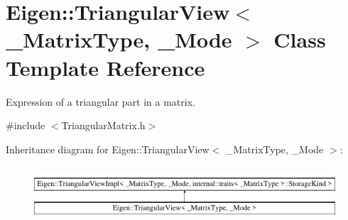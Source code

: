 \hypertarget{class_eigen_1_1_triangular_view}{}\section{Eigen\+::Triangular\+View$<$ \+\_\+\+Matrix\+Type, \+\_\+\+Mode $>$ Class Template Reference}
\label{class_eigen_1_1_triangular_view}


Expression of a triangular part in a matrix.  




{\ttfamily \#include $<$Triangular\+Matrix.\+h$>$}

Inheritance diagram for Eigen\+::Triangular\+View$<$ \+\_\+\+Matrix\+Type, \+\_\+\+Mode $>$\+:\begin{figure}[H]
\begin{center}
\leavevmode
\includegraphics[height=1.996435cm]{class_eigen_1_1_triangular_view}
\end{center}
\end{figure}
